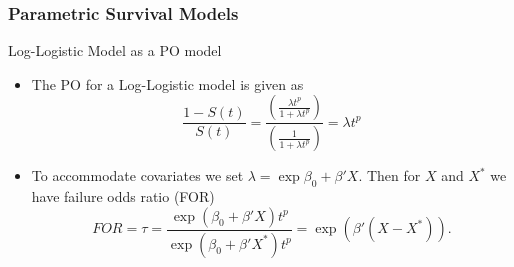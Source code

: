 \documentclass{beamer}
\theoremstyle{definition}
\begin{document}
\begin{frame}
\frametitle{Parametric Survival Models}
\begin{block}{Log-Logistic Model as a PO model}
\begin{itemize}
\item The PO for a Log-Logistic model is given as 
\[
\frac{1-S(t)}{S(t)} = \frac{\left(\frac{\lambda t^p}{1+\lambda t^p}\right)}{\left(\frac{1}{1+\lambda t^p}\right)} = \lambda t^p
\]
\item To accommodate covariates we set $\lambda=\exp{\beta_0 + \beta'X}$.
Then for $X$ and $X^*$ we have failure odds ratio (FOR)
\[
FOR = \tau = \frac{\exp(\beta_0 + \beta'X)t^p}{\exp(\beta_0 + \beta'X^*)t^p} = \exp(\beta'(X-X^*)).
\]
\end{itemize} 
\end{block}
\end{frame}
\end{document}
